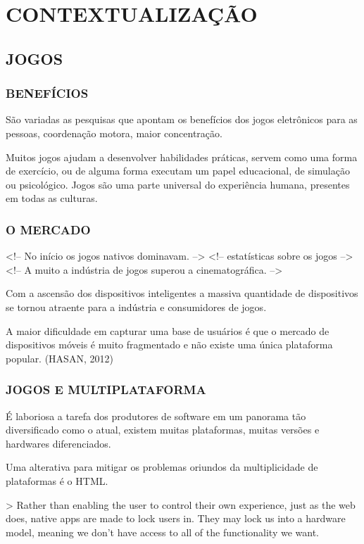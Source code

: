 \documentclass[11pt,a4paper]{article}
\author{Jean Carlo Machado}
\title{}
\begin{document}

\chapter{CONTEXTUALIZAÇÃO}
\section{JOGOS}

\subsection{BENEFÍCIOS}

São variadas as pesquisas que apontam os benefícios dos jogos eletrônicos para as pessoas, coordenação motora, maior concentração.

Muitos jogos ajudam a desenvolver habilidades práticas, servem como uma forma de exercício, ou de alguma forma executam um papel educacional, de simulação ou psicológico. Jogos são uma parte universal do experiência humana, presentes em todas as culturas.

\subsection{O MERCADO}
<!-- No início os jogos nativos dominavam. -->
<!-- estatísticas sobre os jogos -->
<!-- A muito a indústria de jogos superou a cinematográfica. -->

Com a ascensão dos dispositivos inteligentes a massiva quantidade de dispositivos se tornou atraente para a indústria e consumidores de jogos.

A maior dificuldade em capturar uma base de usuários é que o mercado de dispositivos móveis é muito fragmentado e não existe uma única plataforma popular. (HASAN, 2012)

\subsection{JOGOS E MULTIPLATAFORMA}

É laboriosa a tarefa dos produtores de software em um panorama tão diversificado como o atual, existem muitas plataformas, muitas versões e hardwares diferenciados.

Uma alterativa para mitigar os problemas oriundos da multiplicidade de plataformas é o HTML.

> Rather than enabling the user to control their own experience, just as the web does, native apps are made to lock users in. They may lock us into a hardware model, meaning we don’t have access to all of the functionality we want.
\end{document}
